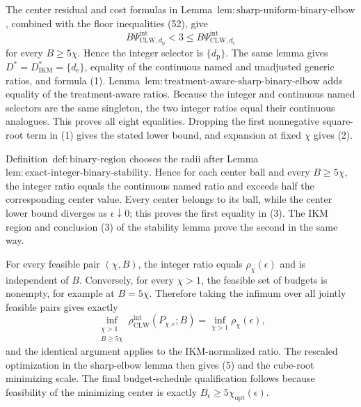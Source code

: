 The center residual and cost formulas in Lemma~\(\mathrm{lem{:}sharp\text{-}uniform\text{-}binary\text{-}elbow}\), combined with the floor inequalities (52), give
\[
 B\Psi_{\mathrm{CLW},d_{\mathrm p}}^{\mathrm{int}}<3
 \le B\Psi_{\mathrm{CLW},d_{\mathrm e}}^{\mathrm{int}}
\]
for every \(B\ge5\chi\).  Hence the integer selector is \(\{d_{\mathrm p}\}\).  The same lemma gives \(D^*=D_{\mathrm{IKM}}^*=\{d_{\mathrm e}\}\), equality of the continuous named and unadjusted generic ratios, and formula (1).  Lemma~\(\mathrm{lem{:}treatment\text{-}aware\text{-}sharp\text{-}binary\text{-}elbow}\) adds equality of the treatment-aware ratios.  Because the integer and continuous named selectors are the same singleton, the two integer ratios equal their continuous analogues.  This proves all eight equalities.  Dropping the first nonnegative square-root term in (1) gives the stated lower bound, and expansion at fixed \(\chi\) gives (2).

Definition~\(\mathrm{def{:}binary\text{-}region}\) chooses the radii after Lemma~\(\mathrm{lem{:}exact\text{-}integer\text{-}binary\text{-}stability}\).  Hence for each center ball and every \(B\ge5\chi\), the integer ratio equals the continuous named ratio and exceeds half the corresponding center value.  Every center belongs to its ball, while the center lower bound diverges as \(\epsilon\downarrow0\); this proves the first equality in (3).  The IKM region and conclusion (3) of the stability lemma prove the second in the same way.

For every feasible pair \((\chi,B)\), the integer ratio equals \(\rho_\chi(\epsilon)\) and is independent of \(B\).  Conversely, for every \(\chi>1\), the feasible set of budgets is nonempty, for example at \(B=5\chi\).  Therefore taking the infimum over all jointly feasible pairs gives exactly
\[
 \inf_{\substack{\chi>1\\B\ge5\chi}}
 \rho_{\mathrm{CLW}}^{\mathrm{int}}(P_{\chi,\epsilon};B)
 =\inf_{\chi>1}\rho_\chi(\epsilon),
\]
and the identical argument applies to the IKM-normalized ratio.  The rescaled optimization in the sharp-elbow lemma then gives (5) and the cube-root minimizing scale.  The final budget-schedule qualification follows because feasibility of the minimizing center is exactly \(B_\epsilon\ge5\chi_{\mathrm{opt}}(\epsilon)\).